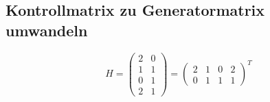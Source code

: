 \subsection{Kontrollmatrix zu Generatormatrix umwandeln}

$$
H = \begin{pmatrix}
2 & 0\\
1 & 1\\
0 & 1\\
2 & 1
\end{pmatrix} = \begin{pmatrix}
2 & 1 & 0 & 2\\
0 & 1 & 1 & 1
\end{pmatrix}^T
$$